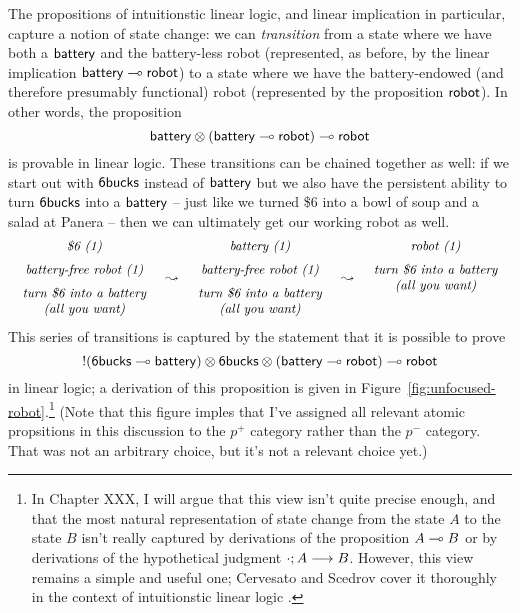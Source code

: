 The propositions of intuitionstic linear logic, and linear implication
in particular, capture a notion of state change: we can {\it
  transition} from a state where we have both a ${\sf battery}$ and
the battery-less robot (represented, as before, by the linear
implication ${\sf battery} \multimap {\sf robot}$) to a state where we
have the battery-endowed (and therefore presumably functional) robot
(represented by the proposition ${\sf robot}$). In other words, the
proposition
%
\[{\sf battery} \otimes ({\sf battery} \multimap {\sf robot}) \multimap
{\sf robot}\] 
%
is provable in linear logic. These transitions can be chained
together as well: if we start out with ${\sf
  6bucks}$ instead of ${\sf battery}$ but we also have the
persistent ability to turn ${\sf 6bucks}$ into a ${\sf battery}$ --
just like we turned \$6 into a bowl of soup and a salad at Panera --
then we can ultimately get our working robot as well.
\[
\begin{array}{ccccc}
\begin{array}{c}
\mbox{\it \$6 (1)}\medskip\\ 
\mbox{\it battery-free robot (1)} \medskip\\ 
\mbox{\it turn \$6 into a battery}\\
\mbox{\it (all you want)}
\end{array}
& \leadsto &
\begin{array}{c}
\mbox{\it battery  (1)}\medskip\\ 
\mbox{\it battery-free robot (1)} \medskip\\ 
\mbox{\it turn \$6 into a battery}\\
\mbox{\it (all you want)}
\end{array}
& \leadsto &
\begin{array}{c}
\mbox{\it robot (1)} \medskip\\ 
\mbox{\it turn \$6 into a battery}\\
\mbox{\it (all you want)}\medskip\\~\\
\end{array}
\end{array}
\]
This series of transitions is captured by the statement that it is 
possible to prove
\[{!}({\sf 6bucks} \multimap {\sf battery}) \otimes {\sf 6bucks} \otimes
({\sf battery} \multimap {\sf robot}) \multimap {\sf robot}\] in linear
logic; a derivation of this proposition is given in
Figure~\ref{fig:unfocused-robot}.\footnote{In Chapter XXX, I will
  argue that this view isn't quite precise enough, and that the most
  natural representation of state change from the state $A$ to the
  state $B$ isn't really captured by derivations of the proposition $A
  \multimap B$ or by derivations of the hypothetical judgment
  ${\cdot};{A} \longrightarrow {B} \mathstrut$.  However, this view remains a simple and useful
  one; Cervesato and Scedrov cover it thoroughly in the context of
  intuitionstic linear logic \cite{cervesato09relating}.}  (Note that
this figure imples that I've assigned all relevant atomic propsitions
in this discussion to the $p^+$ category rather than the $p^-$
category. That was not an arbitrary choice, but it's not a relevant
choice yet.)

